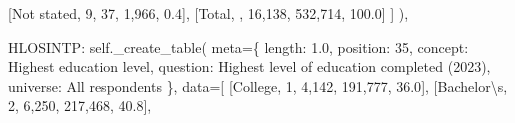 \documentclass[
  11pt,
  a4paper,
]{article}
\newenvironment{Shaded}{\begin{snugshade}}{\end{snugshade}}
\newcommand{\CharTok}[1]{\textcolor[rgb]{0.13,0.47,0.30}{#1}}
\newcommand{\NormalTok}[1]{\textcolor[rgb]{0.00,0.23,0.31}{#1}}
\newcommand{\OperatorTok}[1]{\textcolor[rgb]{0.37,0.37,0.37}{#1}}
\newcommand{\StringTok}[1]{\textcolor[rgb]{0.13,0.47,0.30}{#1}}
\newcommand{\VariableTok}[1]{\textcolor[rgb]{0.07,0.07,0.07}{#1}}
\begin{document}
\begin{Shaded}
\begin{Highlighting}[]
\NormalTok{                [}\StringTok{\textquotesingle{}Not stated\textquotesingle{}}\NormalTok{, }\StringTok{\textquotesingle{}9\textquotesingle{}}\NormalTok{, }\StringTok{\textquotesingle{}37\textquotesingle{}}\NormalTok{, }\StringTok{\textquotesingle{}1,966\textquotesingle{}}\NormalTok{, }\StringTok{\textquotesingle{}0.4\textquotesingle{}}\NormalTok{],}
\NormalTok{                [}\StringTok{\textquotesingle{}Total\textquotesingle{}}\NormalTok{, }\StringTok{\textquotesingle{}\textquotesingle{}}\NormalTok{, }\StringTok{\textquotesingle{}16,138\textquotesingle{}}\NormalTok{, }\StringTok{\textquotesingle{}532,714\textquotesingle{}}\NormalTok{, }\StringTok{\textquotesingle{}100.0\textquotesingle{}}\NormalTok{]}
\NormalTok{                ]}
\NormalTok{            ),}
        
            \StringTok{\textquotesingle{}HLOSINTP\textquotesingle{}}\NormalTok{: }\VariableTok{self}\NormalTok{.\_create\_table(}
\NormalTok{                meta}\OperatorTok{=}\NormalTok{\{}
                \StringTok{\textquotesingle{}length\textquotesingle{}}\NormalTok{: }\StringTok{\textquotesingle{}1.0\textquotesingle{}}\NormalTok{, }\StringTok{\textquotesingle{}position\textquotesingle{}}\NormalTok{: }\StringTok{\textquotesingle{}35\textquotesingle{}}\NormalTok{,}
                \StringTok{\textquotesingle{}concept\textquotesingle{}}\NormalTok{: }\StringTok{\textquotesingle{}Highest education level\textquotesingle{}}\NormalTok{,}
                \StringTok{\textquotesingle{}question\textquotesingle{}}\NormalTok{: }\StringTok{\textquotesingle{}Highest level of education completed (2023)\textquotesingle{}}\NormalTok{,}
                \StringTok{\textquotesingle{}universe\textquotesingle{}}\NormalTok{: }\StringTok{\textquotesingle{}All respondents\textquotesingle{}}
\NormalTok{                \},}
\NormalTok{                data}\OperatorTok{=}\NormalTok{[}
\NormalTok{                [}\StringTok{\textquotesingle{}College\textquotesingle{}}\NormalTok{, }\StringTok{\textquotesingle{}1\textquotesingle{}}\NormalTok{, }\StringTok{\textquotesingle{}4,142\textquotesingle{}}\NormalTok{, }\StringTok{\textquotesingle{}191,777\textquotesingle{}}\NormalTok{, }\StringTok{\textquotesingle{}36.0\textquotesingle{}}\NormalTok{],}
\NormalTok{                [}\StringTok{\textquotesingle{}Bachelor}\CharTok{\textbackslash{}\textquotesingle{}}\StringTok{s\textquotesingle{}}\NormalTok{, }\StringTok{\textquotesingle{}2\textquotesingle{}}\NormalTok{, }\StringTok{\textquotesingle{}6,250\textquotesingle{}}\NormalTok{, }\StringTok{\textquotesingle{}217,468\textquotesingle{}}\NormalTok{, }\StringTok{\textquotesingle{}40.8\textquotesingle{}}\NormalTok{],}

\end{Highlighting}
\end{Shaded}
\end{document}

